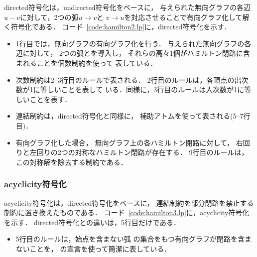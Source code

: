\textsf{directed}符号化は，\textsf{undirected}符号化をベースに，
与えられた無向グラフの各辺$u-v$に対して，2つの弧$u\rightarrow v$と
$v\rightarrow u$を対応させることで有向グラフ化して解く符号化である．
コード~\ref{code:hamilton2.lp}に，\textsf{directed}符号化を示す．
\begin{itemize}
\item 1行目では，無向グラフの有向グラフ化を行う．
  与えられた無向グラフの各辺に対して，
  2つの弧とを導入し，
  それらの高々1個がハミルトン閉路に含まれることを個数制約を使って
  表している．
\item 次数制約は2--3行目のルールで表される．
  2行目のルールは，各頂点の出次数が1に等しいことを表して
  いる．同様に，3行目のルールは入次数が1に等しいことを表す．
\item 連結制約は，\textsf{directed}符号化と同様に，
  補助アトムを使って表される(5--7行目)．
\item 有向グラフ化した場合，
  無向グラフ上の各ハミルトン閉路に対して，
  右回りと左回りの2つの対称なハミルトン閉路が存在する．
  9行目のルールは，この対称解を除去する制約である．
\end{itemize}

\subsubsection{\textsf{acyclicity}符号化}



\textsf{acyclicity}符号化は，\textsf{directed}符号化をベースに，
連結制約を部分閉路を禁止する制約に置き換えたものである．
コード~\ref{code:hamilton3.lp}に，\textsf{acyclicity}符号化を示す．
\textsf{directed}符号化との違いは，5行目だけである．
\begin{itemize}
\item 5行目のルールは，始点を含まない弧
  の集合をもつ有向グラフが閉路を含まないことを，
  {\clingo}の宣言を使って簡潔に表している．
\end{itemize}

